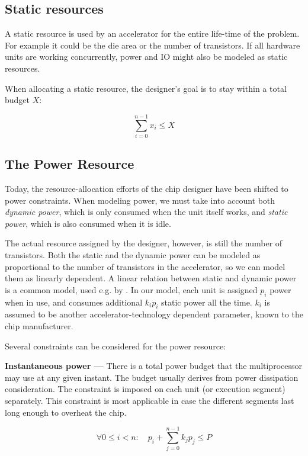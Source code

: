 \documentclass[twocolumn,english]{IEEEtran}
\begin{document}
\subsection{\label{sub:resource-static}Static resources}

A static resource is used by an accelerator for the entire life-time
of the problem. For example it could be the die area or the number
of transistors. If all hardware units are working concurrently, power
and IO might also be modeled as static resources.

When allocating a static resource, the designer's goal is to stay
within a total budget $X$:

\[
\sum_{i=0}^{n-1}x_{i}\leq X\]



\subsection{The Power Resource}

Today, the resource-allocation efforts of the chip designer have been
shifted to power constraints. When modeling power, we must take into
account both \textit{dynamic power}, which is only consumed when the
unit itself works, and \textit{static power}, which is also consumed
when it is idle.

The actual resource assigned by the designer, however, is still the
number of transistors. Both the static and the dynamic power can be
modeled as proportional to the number of transistors in the accelerator,
so we can model them as linearly dependent. A linear relation between
static and dynamic power is a common model, used e.g. by \cite{ExtendingAmda}.
In our model, each unit is assigned $p_{i}$ power when in use, and
consumes additional $k_{i}p_{i}$ static power all the time. $k_{i}$
is assumed to be another accelerator-technology dependent parameter,
known to the chip manufacturer.

Several constraints can be considered for the power resource:

\textbf{Instantaneous power ---} There is a total power budget that
the multiprocessor may use at any given instant. The budget usually
derives from power dissipation consideration. The constraint is imposed
on each unit (or execution segment) separately. This constraint is
most applicable in case the different segments last long enough to
overheat the chip. 

\[
\forall0\leq i<n:\quad p_{i}+\sum_{j=0}^{n-1}k_{j}p_{j}\leq P\]
\end{document}
